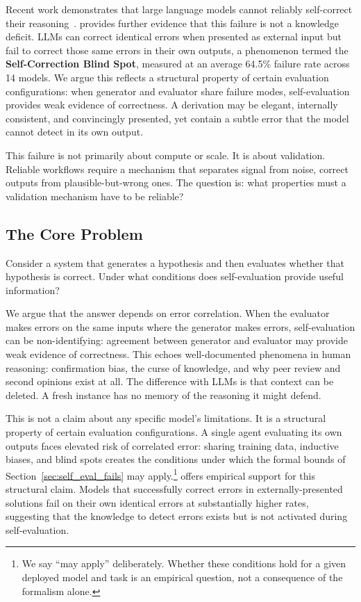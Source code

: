 \documentclass[11pt]{article}
\begin{document}
Recent work demonstrates that large language models cannot reliably self-correct their
reasoning~\citep{huang2024selfcorrect}. \citet{tsui2025selfcorrection} provides further
evidence that this failure is not a knowledge deficit. LLMs can correct identical errors when
presented as external input but fail to correct those same errors in their own outputs, a
phenomenon termed the \textbf{Self-Correction Blind Spot}, measured at an average 64.5\%
failure rate across 14 models. We argue this reflects a structural property of certain
evaluation configurations: when generator and evaluator share failure modes, self-evaluation
provides weak evidence of correctness. A derivation may be elegant, internally consistent,
and convincingly presented, yet contain a subtle error that the model cannot detect in its
own output.

This failure is not primarily about compute or scale. It is about validation. Reliable
workflows require a mechanism that separates signal from noise, correct outputs from
plausible-but-wrong ones. The question is: what properties must a validation mechanism have
to be reliable?

\subsection{The Core Problem}

Consider a system that generates a hypothesis and then evaluates whether that hypothesis is
correct. Under what conditions does self-evaluation provide useful information?

We argue that the answer depends on error correlation. When the evaluator makes errors on
the same inputs where the generator makes errors, self-evaluation can be non-identifying:
agreement between generator and evaluator may provide weak evidence of correctness. This
echoes well-documented phenomena in human reasoning: confirmation bias, the curse of
knowledge, and why peer review and second opinions exist at all. The difference with LLMs
is that context can be deleted. A fresh instance has no memory of the reasoning it might
defend.

This is not a claim about any specific model's limitations. It is a structural property of
certain evaluation configurations. A single agent evaluating its own outputs faces elevated
risk of correlated error: sharing training data, inductive biases, and blind spots creates
the conditions under which the formal bounds of Section~\ref{sec:self_eval_fails} may
apply.\footnote{We say ``may apply'' deliberately. Whether these conditions hold for a
given deployed model and task is an empirical question, not a consequence of the formalism
alone.} \citet{tsui2025selfcorrection} offers empirical support for this structural claim.
Models that successfully correct errors in externally-presented solutions fail on their own
identical errors at substantially higher rates, suggesting that the knowledge to detect errors
exists but is not activated during self-evaluation.
\end{document}
